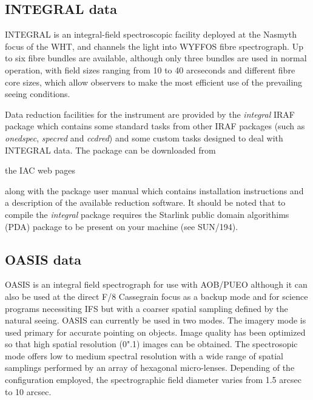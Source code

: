 \documentclass[twoside,11pt]{article}
\newcommand{\htmladdnormallink}[2]{#1}
\newcommand{\xref}[3]{#1}
\newcommand{\xlabel}[1]{}
\begin{document}
\subsection{\xlabel{sc16_integral}INTEGRAL data\label{sc16_integral}}

\htmladdnormallink{INTEGRAL}{http://www.ing.iac.es/~bgarcia/integral/html/integral_home.html} is an integral-field spectroscopic facility deployed at the Nasmyth focus of the WHT, and channels the light into WYFFOS fibre spectrograph. Up to six fibre bundles are available, although only three bundles are used in normal operation, with field sizes ranging from 10 to 40 arcseconds and different fibre core sizes, which allow observers to make the most efficient use of the prevailing seeing conditions.

Data reduction facilities for the instrument are provided by the {\em integral} IRAF package which contains some standard tasks from other IRAF packages (such as {\em onedspec}, {\em specred} and {\em ccdred}) and some custom tasks designed to deal with INTEGRAL data. The package can be \htmladdnormallink{downloaded}{http://andromeda.roque.ing.iac.es/~astrosw/InstSoft/integral/integral-0.3.tar.gz} from 
\begin{htmlonly}
the IAC web pages
\end{htmlonly}
 along with the package \htmladdnormallink{user manual}{http://andromeda.roque.ing.iac.es/~astrosw/InstSoft/integral/manual_de_reducciones.ps.gz} which contains installation instructions and a description of the available reduction software. It should be noted that to compile the {\em integral} package requires the Starlink public domain algorithims (PDA) package to be present on your machine (see \xref{SUN/194}{sun194}{}).

\subsection{\xlabel{sc16_oasis}OASIS data\label{sc16_oasis}}

\htmladdnormallink{OASIS}{http://www.cfht.hawaii.edu/Instruments/Spectroscopy/OASIS/} is an integral field spectrograph for use with \htmladdnormallink{AOB/PUEO}{http://www.cfht.hawaii.edu/Instruments/Imaging/AOB/} although it can also be used at the direct F/8 Cassegrain focus as a backup mode and for science programs necessiting IFS but with a coarser spatial sampling defined by the natural seeing. OASIS can currently be used in two modes. The imagery mode is used primary for accurate pointing on objects. Image quality has been optimized so that high spatial resolution (0".1) images can be obtained. The spectrosopic mode offers low to medium spectral resolution with a wide range of spatial samplings performed by an array of hexagonal micro-lenses. Depending of the configuration employed, the spectrographic field diameter varies from 1.5 arcsec to 10 arcsec.
\end{document}

